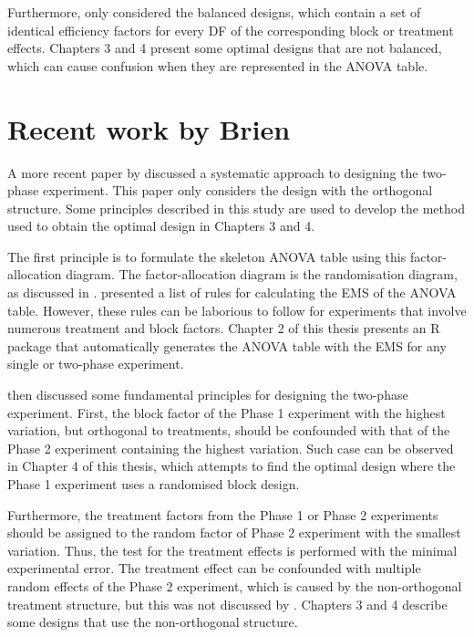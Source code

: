 \documentclass[11pt,a4paper]{article}
\begin{document}
Furthermore, \cite{Brien2009, Brien2010} only considered the balanced designs, which contain a set of identical efficiency factors for every DF of the corresponding block or treatment effects. Chapters 3 and 4 present some optimal designs that are not balanced, which can cause confusion when they are represented in the ANOVA table.   
 
\section{Recent work by Brien}
\label{sec:brien2011}
A more recent paper by \cite{Brien2011} discussed a systematic approach to designing the two-phase experiment. This paper only considers the design with the orthogonal structure. Some principles described in this study are used to develop the method used to obtain the optimal design in Chapters 3 and 4. 

The first principle is to formulate the skeleton ANOVA table using this factor-allocation diagram. The factor-allocation diagram is the randomisation diagram, as discussed in \cite{Brien2006b}. \cite{Brien2011} presented a list of rules for calculating the EMS of the ANOVA table. However, these rules can be laborious to follow for experiments that involve numerous treatment and block factors. Chapter 2 of this thesis presents an R package that automatically generates the ANOVA table with the EMS for any single or two-phase experiment. 

\cite{Brien2011} then discussed some fundamental principles for designing the two-phase experiment. First, the block factor of the Phase 1 experiment with the highest variation, but orthogonal to treatments, should be confounded with that of the Phase 2 experiment containing the highest variation. Such case can be observed in Chapter 4 of this thesis, which attempts to find the optimal design where the Phase 1 experiment uses a randomised block design. 

Furthermore, the treatment factors from the Phase 1 or Phase 2 experiments should be assigned to the random factor of Phase 2 experiment with the smallest variation. Thus, the test for the treatment effects is performed with the minimal experimental error. The treatment effect can be confounded with multiple random effects of the Phase 2 experiment, which is caused by the non-orthogonal treatment structure, but this was not discussed by \cite{Brien2011}. Chapters 3 and 4 describe some designs that use the non-orthogonal structure. 
\end{document}
